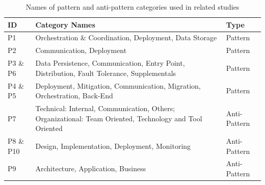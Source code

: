 \documentclass{Configuration_Files/PoliMi3i_thesis}
\begin{document}
\begin{table}[H]
\centering 
    \begin{tabular}{|l p{27em} l|}
    \hline
    \rowcolor{bluepoli!40}
    \textbf{ID} & \textbf{Category Names} & \textbf{Type}\T\B \\
    \hline \hline
    P1 & Orchestration \& Coordination, Deployment, Data Storage & Pattern\T\B\\
    \hline
    \rowcolor{bluepoli!10}
    P2 & Communication, Deployment & Pattern\T\B\\
    \hline
    P3 \& P6 & Data Persistence, Communication, Entry Point, Distribution, Fault Tolerance, Supplementals & Pattern\T\B\\
    \hline
    \rowcolor{bluepoli!10}
    P4 \& P5 & Deployment, Mitigation, Communication, Migration, Orchestration, Back-End & Pattern\T\B\\
    \hline
    P7 & Technical: Internal, Communication, Others; Organizational: Team Oriented, Technology and Tool Oriented & Anti-Pattern\T\B\\
    \hline
    \rowcolor{bluepoli!10}
    P8 \& P10 & Design, Implementation, Deployment, Monitoring & Anti-Pattern\T\B\\
    \hline
    P9 & Architecture, Application, Business & Anti-Pattern\T\B\\
    \hline
    \end{tabular}
    \\[10pt]
    \caption{Names of pattern and anti-pattern categories used in related studies}
    \label{table:category_names}
\end{table}
\end{document}
